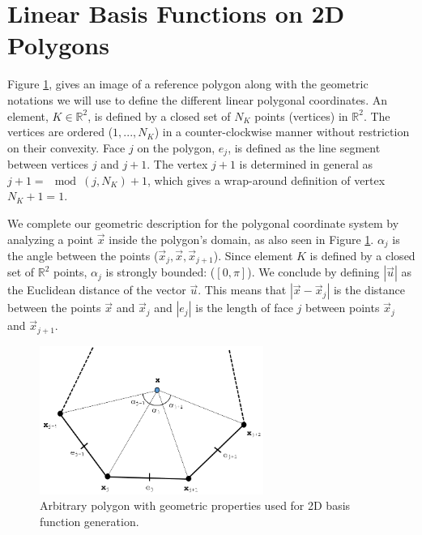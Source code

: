 \section{Linear Basis Functions on 2D Polygons}
\label{sec::BF_2DLinear}

Figure \ref{fig::BF_2D_ref_polygon}, gives an image of a reference polygon along with the geometric notations we will use to define the different linear polygonal coordinates. An element, $K\in \mathbb{R}^2$, is defined by a closed set of $N_K$ points (vertices) in $\mathbb{R}^2$. The vertices are ordered ($1,...,N_K$) in a counter-clockwise manner without restriction on their convexity. Face $j$ on the polygon, $e_j$, is defined as the line segment between vertices $j$ and $j+1$. The vertex $j+1$ is determined in general as $j+1 =\mod(j,N_K)+1$, which gives a wrap-around definition of vertex $N_K+1 = 1$.

We complete our geometric description for the polygonal coordinate system by analyzing a point $\vec{x}$ inside the polygon's domain, as also seen in Figure \ref{fig::BF_2D_ref_polygon}. $\alpha_j$ is the angle between the points ($\vec{x}_j, \vec{x}, \vec{x}_{j+1}$). Since element $K$ is defined by a closed set of $\mathbb{R}^2$ points, $\alpha_j$ is strongly bounded: ($[0, \pi]$). We conclude by defining $|\vec{u}|$ as the Euclidean distance of the vector $\vec{u}$. This means that $|\vec{x} - \vec{x}_j|$ is the distance between the points $\vec{x}$ and $\vec{x}_j$ and $|e_j|$ is the length of face $j$ between points $\vec{x}_j$ and $\vec{x}_{j+1}$.

\begin{figure}[hbt]
\centering
\includegraphics[width=0.65\textwidth]{figures/sec_BF/ref_polygon.png}
\caption{Arbitrary polygon with geometric properties used for 2D basis function generation.}
\label{fig::BF_2D_ref_polygon}
\end{figure}

